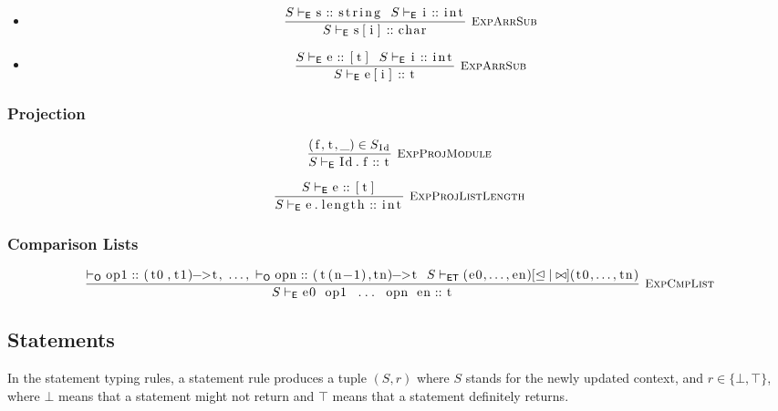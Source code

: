 \documentclass{article}
\newcommand{\code}[1]{\lstinline[columns=fixed]{#1}}
\newcommand{\drmrule}[5]{\frac{#1}{#2\vdash_{\mathsf{#3}}#4}\textsc{\ \small{#5}}}
\newcommand{\ruleapp}[1]{\vdash_{\mathsf{#1}}}
\newcommand{\mc}[1]{\textnormal{\code{#1}}}
\begin{document}
				\begin{itemize}
					\item
						\begin{align*}
							\drmrule{S\ruleapp{E}\mc{s}::\mc{string}\ \ S\ruleapp{E}\mc{i}::\mc{int}}{S}{E}{\mc{s[i]} :: \mc{char}}{ExpArrSub}
						\end{align*}
					\item
						\begin{align*}
							\drmrule{S\ruleapp{E}\mc{e}::\mc{[t]}\ \ S\ruleapp{E}\mc{i}::\mc{int}}{S}{E}{\mc{e[i]} :: \mc{t}}{ExpArrSub}
						\end{align*}
				\end{itemize}
			
			\subsubsection{Projection}
			
				\begin{align*}
					\drmrule{(\mc{f},\mc{t},\_)\in S_{\mc{Id}}}{S}{E}{\mc{Id.f}::\mc{t}}{ExpProjModule}
				\end{align*}
			
				\begin{align*}
					\drmrule{S\ruleapp{E}\mc{e}::\mc{[t]}}{S}{E}{\mc{e.length} :: \mc{int}}{ExpProjListLength}
				\end{align*}
			
			\subsubsection{Comparison Lists}
			
				\begin{align*}
					\drmrule{\ruleapp{O}\mc{op1}::\mc{(t0,t1)->t},\ \dots,\ \ruleapp{O}\mc{opn}::\mc{(t(n-1),tn)->t}\ \ S\ruleapp{ET} (\mc{e0},\dots,\mc{en}) [\trianglelefteq|\bowtie] (\mc{t0},\dots,\mc{tn})}{S}{E}{\mc{e0 op1 ... opn en} :: \mc{t}}{ExpCmpList}
				\end{align*}
				
		\subsection{Statements}
		
			In the statement typing rules, a statement rule produces a tuple $(S,r)$ where $S$ stands for the newly updated context, and $r\in\{\bot,\top\}$, where $\bot$ means that a statement might not return and $\top$ means that a statement definitely returns.
			
\end{document}

